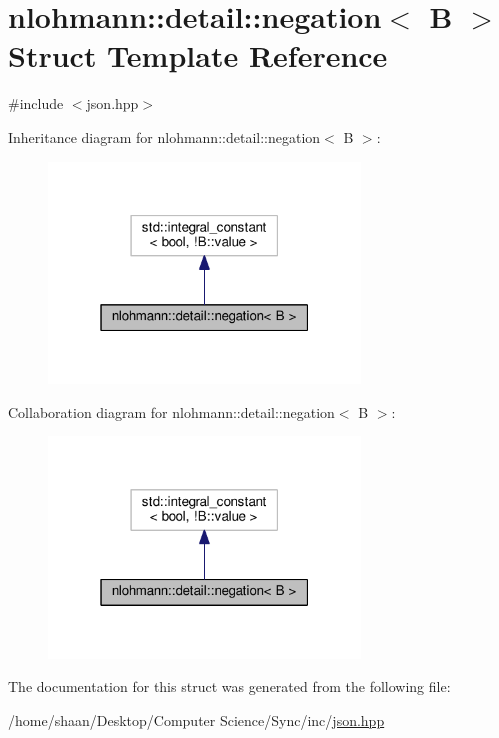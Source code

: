 \hypertarget{structnlohmann_1_1detail_1_1negation}{}\section{nlohmann\+:\+:detail\+:\+:negation$<$ B $>$ Struct Template Reference}
\label{structnlohmann_1_1detail_1_1negation}


{\ttfamily \#include $<$json.\+hpp$>$}



Inheritance diagram for nlohmann\+:\+:detail\+:\+:negation$<$ B $>$\+:\nopagebreak
\begin{figure}[H]
\begin{center}
\leavevmode
\includegraphics[width=235pt]{structnlohmann_1_1detail_1_1negation__inherit__graph}
\end{center}
\end{figure}


Collaboration diagram for nlohmann\+:\+:detail\+:\+:negation$<$ B $>$\+:\nopagebreak
\begin{figure}[H]
\begin{center}
\leavevmode
\includegraphics[width=235pt]{structnlohmann_1_1detail_1_1negation__coll__graph}
\end{center}
\end{figure}


The documentation for this struct was generated from the following file\+:\begin{DoxyCompactItemize}
\item 
/home/shaan/\+Desktop/\+Computer Science/\+Sync/inc/\hyperlink{json_8hpp}{json.\+hpp}\end{DoxyCompactItemize}
